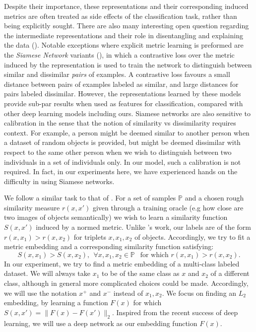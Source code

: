 \documentclass{article} %
\begin{document}
Despite their importance, these representations and their corresponding induced metrics are often  
treated as side effects of the  classification task, rather than being explicitly sought.
There are also many interesting open question regarding the intermediate representations and their role in disentangling and explaining the data (\citet{Bengio2013}).
Notable exceptions where explicit metric learning is preformed are the \emph{Siamese Network} variants (\citet{bromley1993signature,Chopra2005,hadsell2006dimensionality}), in which a contrastive loss over 
the metric induced by the representation  is used to train the network to distinguish between similar and dissimilar \emph{pairs} of examples.  A contrastive loss favours a small distance between pairs of examples
labeled as similar, and large distances for pairs labeled dissimilar.
However, the representations learned by these models provide sub-par results when used as features for classification, compared with other deep learning models including ours. Siamese networks are also sensitive to calibration in the sense that the notion of similarity vs dissimilarity requires context.  
For example, a person might be deemed similar to another person when a dataset of random objects is provided, but might be deemed dissimilar with respect to the same other person when we wish to distinguish between two individuals in a set of individuals only. %
In our model, such a calibration is not required.
In fact, in our experiments here, we have experienced hands on the difficulty in using Siamese networks.

We follow a similar task to that of \citet{chechik2010large}. For a set of samples $\mathbb{P}$ and a chosen rough similarity measure $r(x,x')$ given through a training oracle
(e.g how close are two images of objects semantically) we wish to learn a similarity function $S(x,x')$ induced by a normed metric.
Unlike  \citet{chechik2010large}'s work, our labels are of the form $r(x,x_1)>r(x,x_2)$ for triplets $x,x_1,x_2$ of objects.
Accordingly, we try to fit a metric embedding and a corresponding similarity function satisfying:
$$ S(x,x_1)>S(x,x_2), \ \ \forall x,x_1,x_2 \in \mathbb{P} \ \ \text{ for which } r(x,x_1)>r(x,x_2).$$
In our experiment, we try to find a metric embedding of a multi-class labeled dataset. We will always take $x_1$ to be of the same class as $x$ and $x_2$ of a different class, although in general more complicated choices could be made.
Accordingly, we will use the notation $x^{+}$ and $x^{-}$ instead of $x_1, x_2$.
We focus on finding an $L_2$ embedding, by learning a function $F(x)$ for which $S(x,x')=\|F(x)-F(x')\|_2$.
Inspired from the recent success of deep learning, we will use a deep network as our embedding function $F(x)$.
\end{document}
